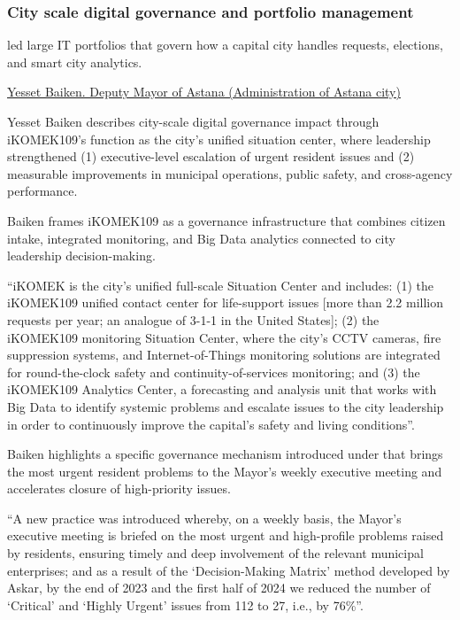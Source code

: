 \subsubsection{City scale digital governance and portfolio management}

\label{subsubsecContribCityGovernance}

\mrl{} led large IT portfolios that govern how a capital city handles requests, elections, and smart city analytics.

\bigskip
\noindent\underline{Yesset Baiken. Deputy Mayor of Astana (Administration of Astana city)}

Yesset Baiken describes \mrls city-scale digital governance impact through iKOMEK109’s function as the city’s unified situation center, where \mrls leadership strengthened (1) executive-level escalation of urgent resident issues and (2) measurable improvements in municipal operations, public safety, and cross-agency performance.

Baiken frames iKOMEK109 as a governance infrastructure that combines citizen intake, integrated monitoring, and Big Data analytics connected to city leadership decision-making.
\begin{fullquote}
``iKOMEK is the city’s unified full-scale Situation Center and includes: (1) the iKOMEK109 unified contact center for life-support issues [more than 2.2 million requests per year; an analogue of 3-1-1 in the United States]; (2) the iKOMEK109 monitoring Situation Center, where the city’s CCTV cameras, fire suppression systems, and Internet-of-Things monitoring solutions are integrated for round-the-clock safety and continuity-of-services monitoring; and (3) the iKOMEK109 Analytics Center, a forecasting and analysis unit that works with Big Data to identify systemic problems and escalate issues to the city leadership in order to continuously improve the capital’s safety and living conditions''.
\end{fullquote}

Baiken highlights a specific governance mechanism introduced under \mrl{} that brings the most urgent resident problems to the Mayor’s weekly executive meeting and accelerates closure of high-priority issues.
\begin{fullquote}
``A new practice was introduced whereby, on a weekly basis, the Mayor’s executive meeting is briefed on the most urgent and high-profile problems raised by residents, ensuring timely and deep involvement of the relevant municipal enterprises; and as a result of the `Decision-Making Matrix' method developed by Askar, by the end of 2023 and the first half of 2024 we reduced the number of `Critical' and `Highly Urgent' issues from 112 to 27, i.e., by 76\%''.
\end{fullquote}

